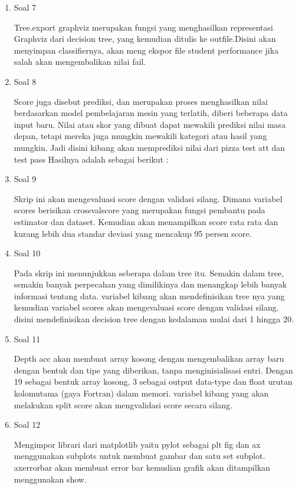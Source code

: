 \begin{enumerate}
	\item Soal 7
	\hfill\break
	
	Tree.export graphviz merupakan fungsi yang menghasilkan representasi Graphviz dari decision tree, yang kemudian ditulis ke outfile.Disini akan menyimpan classifiernya, akan meng ekspor file student performance jika salah akan mengembalikan nilai fail. 

	\item Soal 8
	\hfill\break
	
	Score juga disebut prediksi, dan merupakan proses menghasilkan nilai berdasarkan model pembelajaran mesin yang terlatih, diberi beberapa data input baru. Nilai atau skor yang dibuat dapat mewakili prediksi nilai masa depan, tetapi mereka juga mungkin mewakili kategori atau hasil yang mungkin. Jadi disini kibang akan memprediksi nilai dari pizza test att dan test pass Hasilnya adalah sebagai berikut :

	\item Soal 9
	\hfill\break
	
	Skrip ini akan mengevaluasi score dengan validasi silang. Dimana variabel scores berisikan crossvalscore yang merupakan fungsi pembantu pada estimator dan dataset. Kemudian akan menampilkan score rata rata dan kurang lebih dua standar deviasi yang mencakup 95 persen score. 

	\item Soal 10
	\hfill\break
	
	Pada skrip ini menunjukkan seberapa dalam tree itu. Semakin dalam tree, semakin banyak perpecahan yang dimilikinya dan menangkap lebih banyak informasi tentang data. variabel kibang akan mendefinisikan tree nya yang kemudian variabel scores akan mengevaluasi score dengan validasi silang. disini mendefinisikan decision tree dengan kedalaman mulai dari 1 hingga 20. 

	\item Soal 11
	\hfill\break
	
	Depth acc akan membuat array kosong dengan mengembalikan array baru dengan bentuk dan tipe yang diberikan, tanpa menginisialisasi entri. Dengan 19 sebagai bentuk array kosong, 3 sebagai output data-type dan float urutan kolomutama (gaya Fortran) dalam memori. variabel kibang yang akan melakukan split score akan mengvalidasi score secara silang.

	\item Soal 12
	\hfill\break
	
	Mengimpor librari dari matplotlib yaitu pylot sebagai plt fig dan ax menggunakan subplots untuk membuat gambar dan satu set subplot. axerrorbar akan membuat error bar kemudian grafik akan ditampilkan menggunakan show. 
\end{enumerate}


